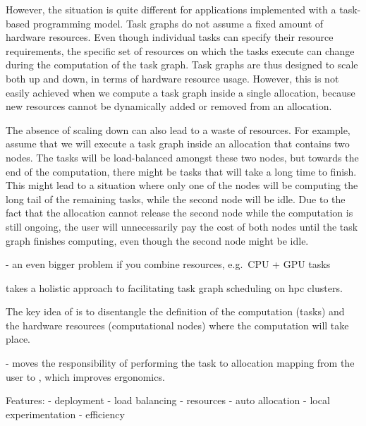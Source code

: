 However, the situation is quite different for applications implemented with a task-based
programming model. Task graphs do not assume a fixed amount of hardware resources. Even though
individual tasks can specify their resource requirements, the specific set of resources on which
the tasks execute can change during the computation of the task graph. Task graphs are thus
designed to scale both up and down, in terms of hardware resource usage. However, this is not
easily achieved when we compute a task graph inside a single allocation, because new resources
cannot be dynamically added or removed from an allocation.

The absence of scaling down can also lead to a waste of resources. For example, assume that we will
execute a task graph inside an allocation that contains two nodes. The tasks will be load-balanced
amongst these two nodes, but towards the end of the computation, there might be tasks that will
take a long time to finish. This might lead to a situation where only one of the nodes will be
computing the long tail of the remaining tasks, while the second node will be idle. Due to the fact
that the allocation cannot release the second node while the computation is still ongoing, the user
will unnecessarily pay the cost of both nodes until the task graph finishes computing, even though
the second node might be idle.

- an even bigger problem if you combine resources, e.g.\ CPU + GPU tasks





\hyperqueue{} takes a holistic approach to facilitating task graph scheduling on
\gls{hpc} clusters.



The key idea of \hyperqueue{} is to disentangle the definition of the computation (tasks)
and the hardware resources (computational nodes) where the computation will take place.

- moves the responsibility of performing the task to allocation mapping from the user to
\hyperqueue{},
which improves ergonomics.


Features: - deployment - load balancing - resources - auto allocation - local experimentation -
efficiency

